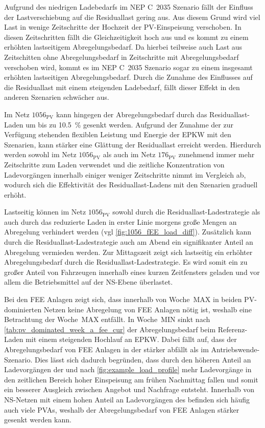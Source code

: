 Aufgrund des niedrigen Ladebedarfs im \gls{NEP} C~\num{2035} Szenario fällt der Einfluss der Lastverschiebung auf die Residuallast gering aus.
Aus diesem Grund wird viel Last in wenige Zeitschritte der Hochzeit der \gls{PV}-Einspeisung verschoben.
In diesen Zeitschritten fällt die Gleichzeitigkeit hoch aus und es kommt zu einem erhöhten lastseitigem Abregelungsbedarf.
Da hierbei teilweise auch Last aus Zeitschitten ohne Abregelungsbedarf in Zeitschritte mit Abregelungsbedarf verschoben wird, kommt es im \gls{NEP} C~\num{2035} Szenario sogar zu einem insgesamt erhöhten lastseitigen Abregelungsbedarf.
Durch die Zunahme des Einflusses auf die Residuallast mit einem steigenden Ladebedarf, fällt dieser Effekt in den anderen Szenarien schwächer aus.\medskip

Im Netz \(1056_{\text{PV}}\) kann hingegen der Abregelungsbedarf durch das Residuallast-Laden um bis zu \SI{10.5}{\percent} gesenkt werden.
Aufgrund der Zunahme der zur Verfügung stehenden flexiblen Leistung und Energie der \gls{EPKW} mit den Szenarien, kann stärker eine Glättung der Residuallast erreicht werden.
Hierdurch werden sowohl im Netz \(1056_{\text{PV}}\) als auch im Netz \(176_{\text{PV}}\) zunehmend immer mehr Zeitschritte zum Laden verwendet und die zeitliche Konzentration von Ladevorgängen innerhalb einiger weniger Zeitschritte nimmt im Vergleich ab, wodurch sich die Effektivität des Residuallast-Ladens mit den Szenarien graduell erhöht.\medskip

Lastseitig können im Netz \(1056_{\text{PV}}\) sowohl durch die Residuallast-Ladestrategie als auch durch das reduzierte Laden in erster Linie morgens große Mengen an Abregelung verhindert werden (vgl \autoref{fig:1056_fEE_load_diff}).
Zusätzlich kann durch die Residuallast-Ladestrategie auch am Abend ein signifikanter Anteil an Abregelung vermieden werden.
Zur Mittagszeit zeigt sich lastseitig ein erhöhter Abregelungsbedarf durch die Residuallast-Ladestrategie.
Es wird somit ein zu großer Anteil von Fahrzeugen innerhalb eines kurzen Zeitfensters geladen und vor allem die Betriebsmittel auf der \gls{NS}-Ebene überlastet.



Bei den \gls{FEE} Anlagen zeigt sich, dass innerhalb von Woche~MAX in beiden \gls{PV}-dominierten Netzen keine Abregelung von \gls{FEE} Anlagen nötig ist, weshalb eine Betrachtung der Woche~MAX entfällt.
In Woche~MIN sinkt nach \autoref{tab:pv_dominated_week_a_fee_cur} der Abregelungsbedarf beim Referenz-Laden mit einem steigenden Hochlauf an \gls{EPKW}.
Dabei fällt auf, dass der Abregelungsbedarf von \gls{FEE} Anlagen in der \SzeFirmenparkplatz stärker abfällt als im Antriebswende-Szenario.
Dies lässt sich dadurch begründen, dass durch den höheren Anteil an Ladevorgängen der \UCs \oeffen und \zH nach \autoref{fig:example_load_profile} mehr Ladevorgänge in den zeitlichen Bereich hoher Einspeisung am frühen Nachmittag fallen und somit ein besserer Ausgleich zwischen Angebot und Nachfrage entsteht.
Innerhalb von \gls{NS}-Netzen mit einem hohen Anteil an Ladevorgängen des \UC \zH befinden sich häufig auch viele \glspl{PVA}, weshalb der Abregelungsbedarf von \gls{FEE} Anlagen stärker gesenkt werden kann.

